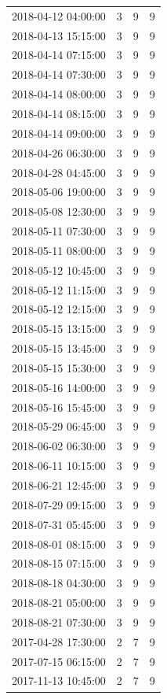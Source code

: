 \begin{tabular}{lrrr}
2018-04-12 04:00:00 & 3 & 9 & 9 \\
2018-04-13 15:15:00 & 3 & 9 & 9 \\
2018-04-14 07:15:00 & 3 & 9 & 9 \\
2018-04-14 07:30:00 & 3 & 9 & 9 \\
2018-04-14 08:00:00 & 3 & 9 & 9 \\
2018-04-14 08:15:00 & 3 & 9 & 9 \\
2018-04-14 09:00:00 & 3 & 9 & 9 \\
2018-04-26 06:30:00 & 3 & 9 & 9 \\
2018-04-28 04:45:00 & 3 & 9 & 9 \\
2018-05-06 19:00:00 & 3 & 9 & 9 \\
2018-05-08 12:30:00 & 3 & 9 & 9 \\
2018-05-11 07:30:00 & 3 & 9 & 9 \\
2018-05-11 08:00:00 & 3 & 9 & 9 \\
2018-05-12 10:45:00 & 3 & 9 & 9 \\
2018-05-12 11:15:00 & 3 & 9 & 9 \\
2018-05-12 12:15:00 & 3 & 9 & 9 \\
2018-05-15 13:15:00 & 3 & 9 & 9 \\
2018-05-15 13:45:00 & 3 & 9 & 9 \\
2018-05-15 15:30:00 & 3 & 9 & 9 \\
2018-05-16 14:00:00 & 3 & 9 & 9 \\
2018-05-16 15:45:00 & 3 & 9 & 9 \\
2018-05-29 06:45:00 & 3 & 9 & 9 \\
2018-06-02 06:30:00 & 3 & 9 & 9 \\
2018-06-11 10:15:00 & 3 & 9 & 9 \\
2018-06-21 12:45:00 & 3 & 9 & 9 \\
2018-07-29 09:15:00 & 3 & 9 & 9 \\
2018-07-31 05:45:00 & 3 & 9 & 9 \\
2018-08-01 08:15:00 & 3 & 9 & 9 \\
2018-08-15 07:15:00 & 3 & 9 & 9 \\
2018-08-18 04:30:00 & 3 & 9 & 9 \\
2018-08-21 05:00:00 & 3 & 9 & 9 \\
2018-08-21 07:30:00 & 3 & 9 & 9 \\
2017-04-28 17:30:00 & 2 & 7 & 9 \\
2017-07-15 06:15:00 & 2 & 7 & 9 \\
2017-11-13 10:45:00 & 2 & 7 & 9 \\

\end{tabular}
